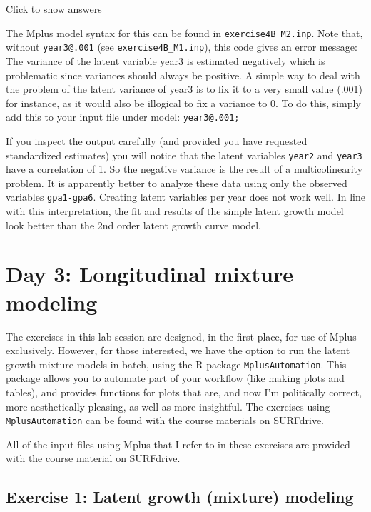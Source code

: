 \documentclass[
]{book}
\begin{document}
Click to show answers

The Mplus model syntax for this can be found in \texttt{exercise4B\_M2.inp}. Note that, without \texttt{year3@.001} (see \texttt{exercise4B\_M1.inp}), this code gives an error message: The variance of the latent variable year3 is estimated negatively which is problematic since variances should always be positive. A simple way to deal with the problem of the latent variance of year3 is to fix it to a very small value (.001) for instance, as it would also be illogical to fix a variance to 0. To do this, simply add this to your input file under model: \texttt{year3@.001;}

If you inspect the output carefully (and provided you have requested standardized estimates) you will notice that the latent variables \texttt{year2} and \texttt{year3} have a correlation of 1. So the negative variance is the result of a multicolinearity problem. It is apparently better to analyze these data using only the observed variables \texttt{gpa1-gpa6}. Creating latent variables per year does not work well. In line with this interpretation, the fit and results of the simple latent growth model look better than the 2nd order latent growth curve model.

\hypertarget{day-3-longitudinal-mixture-modeling}{%
\chapter{Day 3: Longitudinal mixture modeling}\label{day-3-longitudinal-mixture-modeling}}

The exercises in this lab session are designed, in the first place, for use of Mplus exclusively. However, for those interested, we have the option to run the latent growth mixture models in batch, using the R-package \texttt{MplusAutomation}. This package allows you to automate part of your workflow (like making plots and tables), and provides functions for plots that are, and now I'm politically correct, more aesthetically pleasing, as well as more insightful. The exercises using \texttt{MplusAutomation} can be found with the course materials on SURFdrive.

All of the input files using Mplus that I refer to in these exercises are provided with the course material on SURFdrive.

\hypertarget{exercise-1-latent-growth-mixture-modeling}{%
\section{Exercise 1: Latent growth (mixture) modeling}\label{exercise-1-latent-growth-mixture-modeling}}
\end{document}

